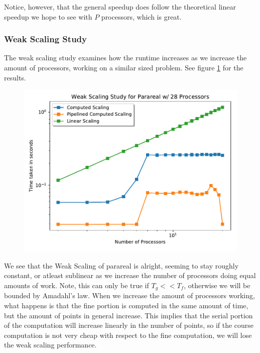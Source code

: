 Notice, however, that the general speedup does follow the theoretical linear
speedup we hope to see with $P$ processors, which is great.

\subsubsection{Weak Scaling Study}

The weak scaling study examines how the runtime increases as we increase the
amount of processors, working on a similar sized problem. See figure
\ref{fig:weak_scaling} for the results.
\begin{figure}[!htb]
  \centering
  \includegraphics[width=.8\textwidth]{./resources/weak_scaling}
  \caption{}\label{fig:weak_scaling}
\end{figure}
We see that the Weak Scaling of parareal is alright, seeming to stay roughly
constant, or atleast sublinear as we increase the number of processors doing
equal amounts of work. Note, this can only be true if $T_g << T_f$, otherwise we
will be bounded by Amadahl's law. When we increase the amount of processors
working, what happens is that the fine portion is computed in the same amount of
time, but the amount of points in general increase. This implies that the serial
portion of the computation will increase linearly in the number of points, so if
the course computation is not very cheap with respect to the fine computation,
we will lose the weak scaling performance.
